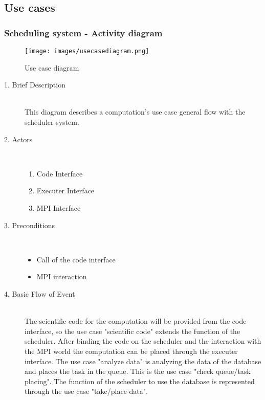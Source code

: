 \subsection{Use cases}

\subsubsection{Scheduling system - Activity diagram}
	\begin{figure}[H]
		\texttt{[image: images/usecasediagram.png]}
		\caption{Use case diagram}
	\end{figure}
	\begin{description}
\item [1. Brief Description]\hfill \\
This diagram describes a computation's use case general flow with the scheduler system.

\item [2. Actors]\hfill \\
\vspace{-6.5mm}
	\begin{enumerate}
		\item Code Interface
		\item Executer Interface
		\item MPI Interface
	\end{enumerate}

\newpage
\item [3. Preconditions]\hfill \\
\vspace{-6.5mm}
\begin{itemize}
\item Call of the code interface
\item MPI interaction

\end{itemize}

\item [4. Basic Flow of Event]\hfill \\
The scientific code for the computation will be provided from the code interface, so the use case "scientific code" extends the function of the scheduler. After binding the code on the scheduler and the interaction with the MPI world the computation can be placed through the executer interface. The use case "analyze data" is analyzing the data of the database and places the task in the queue. This is the use case "check queue/task placing". The function of the scheduler to use the database is represented through the use case "take/place data".



\end{description}
